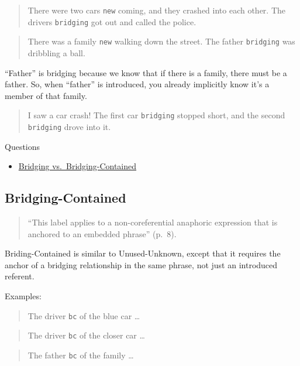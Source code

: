 \documentclass[
]{book}
\providecommand{\tightlist}{%
  \setlength{\itemsep}{0pt}\setlength{\parskip}{0pt}}
\begin{document}
\begin{quote}
There were two cars \texttt{new} coming, and they crashed into each other.
The drivers \texttt{bridging} got out and called the police.
\end{quote}

\begin{quote}
There was a family \texttt{new} walking down the street.
The father \texttt{bridging} was dribbling a ball.
\end{quote}

``Father'' is bridging because we know that if there is a family, there must be a father.
So, when ``father'' is introduced, you already implicitly know it's a member of that family.

\begin{quote}
I saw a car crash! The first car \texttt{bridging} stopped short, and the second \texttt{bridging} drove into it.
\end{quote}

Questions

\begin{itemize}
\tightlist
\item
  \protect\hyperlink{bridging-vs.-bridging-contained}{Bridging vs.~Bridging-Contained}
\end{itemize}

\hypertarget{bridging-contained}{%
\subsection{Bridging-Contained}\label{bridging-contained}}

\begin{quote}
``This label applies to a non-coreferential anaphoric expression that is anchored to an embedded phrase'' (p.~8).
\end{quote}

Briding-Contained is similar to Unused-Unknown, except that it requires the anchor of a bridging relationship in the same phrase, not just an introduced referent.

Examples:

\begin{quote}
The driver \texttt{bc} of the blue car \ldots{}
\end{quote}

\begin{quote}
The driver \texttt{bc} of the closer car \ldots{}
\end{quote}

\begin{quote}
The father \texttt{bc} of the family \ldots{}
\end{quote}
\end{document}
